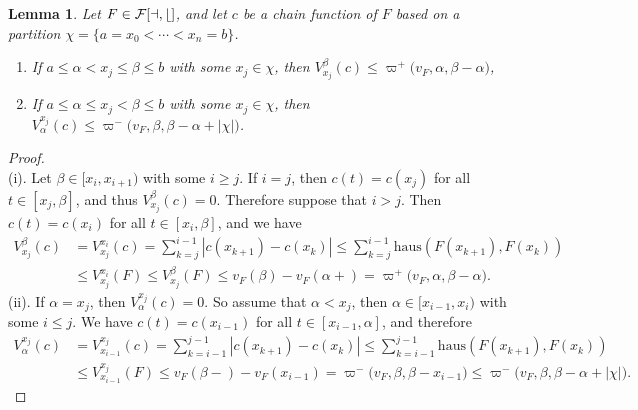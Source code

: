 \documentclass[final,3p,mathptmx]{article}%
\newcommand{\haus}{\mathrm{haus}}
\newcommand{\calF}{\cal{F}[a,b]}
\newcommand{\NewLeftLocalModul}[3]{\varpi^{-}\big( {#1},{#2},{#3} \big)}
\newcommand{\NewRightLocalModul}[3]{\varpi^{+}\big( {#1},{#2},{#3} \big)}
\newtheorem{lemma}[remark]{Lemma}
\begin{document}
{{{%
\begin{lemma}\label{Lemma_Var(chain)} 
	Let $F \in \calF$, and let $c$ be a chain function of $F$  based on a partition ${\chi = \{a = x_0 < \cdots < x_n = b\} }$.  
	\begin{enumerate}
		\item[{(i)}]  If $a \le \alpha < x_j \le \beta \le b$ with some $x_j \in \chi$, then $V_{x_j}^{\beta}(c) \le \NewRightLocalModul{v_F}{\alpha}{\beta -\alpha}$,
		\item[{(ii)}]  If $a \le \alpha \le x_j < \beta \le b$ with some $x_j \in \chi$, then $V_{\alpha}^{x_j}(c) \le \NewLeftLocalModul{v_F}{\beta}{\beta -\alpha + |\chi|}$.
	\end{enumerate}
\end{lemma}

\begin{proof}
	${}$\\
	(i). Let $\beta \in [x_i, x_{i+1})$ with some $i \ge j$. If $i=j$, then $c(t) = c(x_j)$ for all $t \in [x_j,\beta]$, and thus $V_{x_j}^{\beta}(c) = 0$. Therefore suppose that $i > j$. Then $c(t) = c(x_i)$ for all $t \in [x_i,\beta]$, and we have
	\begin{align*}
		V_{x_j}^{\beta}(c) & = V_{x_j}^{x_i}(c) 
		=  \sum_{k=j}^{i-1} |c(x_{k+1}) - c(x_k)|	
		\le \sum_{k=j}^{i-1}  \haus(F(x_{k+1}), F(x_k)) \\&
		\le V_{x_j}^{x_i} (F) \le  V_{x_j}^{\beta}(F)
		\le v_F(\beta) - v_F(\alpha+)  = \NewRightLocalModul{v_F}{\alpha}{\beta - \alpha}.
	\end{align*}
	(ii).
	If $\alpha = x_j$, then $V_{\alpha}^{x_j}(c) =0$. So assume that $\alpha < x_j$, then $\alpha \in [x_{i-1}, x_i)$ with some $i \le j$. We have $c(t) = c(x_{i-1})$ for all $t \in [x_{i-1},\alpha]$, and therefore
	\begin{align*}
		V_{\alpha}^{x_j}(c) & 
		= V_{x_{i-1}}^{x_{j}}(c) 
		= \sum_{k = i-1}^{j-1} |c(x_{k+1}) - c(x_k)|
		\le  \sum_{k = i-1}^{j-1} \haus(F(x_{k+1}), F(x_k))\\&
		\le   V_{x_{i-1}}^{x_{j}}(F)
		\le v_F(\beta-) - v_F(x_{i-1})  
		= \NewLeftLocalModul{v_F}{\beta}{\beta - x_{i-1}} 
		\le \NewLeftLocalModul{v_F}{\beta}{\beta - \alpha+|\chi|}.
	\end{align*}
\end{proof}
\medskip

}}}
\end{document}
